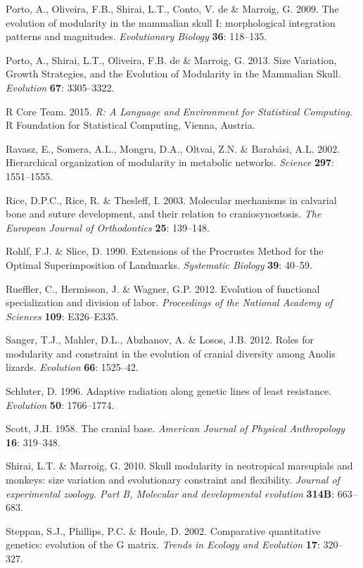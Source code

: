 \documentclass[12pt,]{article}
\begin{document}
Porto, A., Oliveira, F.B., Shirai, L.T., Conto, V. de \& Marroig, G.
2009. The evolution of modularity in the mammalian skull I:
morphological integration patterns and magnitudes. \emph{Evolutionary
Biology} \textbf{36}: 118--135.

Porto, A., Shirai, L.T., Oliveira, F.B. de \& Marroig, G. 2013. Size
Variation, Growth Strategies, and the Evolution of Modularity in the
Mammalian Skull. \emph{Evolution} \textbf{67}: 3305--3322.

R Core Team. 2015. \emph{R: A Language and Environment for Statistical
Computing}. R Foundation for Statistical Computing, Vienna, Austria.

Ravasz, E., Somera, A.L., Mongru, D.A., Oltvai, Z.N. \& Barabási, A.L.
2002. Hierarchical organization of modularity in metabolic networks.
\emph{Science} \textbf{297}: 1551--1555.

Rice, D.P.C., Rice, R. \& Thesleff, I. 2003. Molecular mechanisms in
calvarial bone and suture development, and their relation to
craniosynostosis. \emph{The European Journal of Orthodontics}
\textbf{25}: 139--148.

Rohlf, F.J. \& Slice, D. 1990. Extensions of the Procrustes Method for
the Optimal Superimposition of Landmarks. \emph{Systematic Biology}
\textbf{39}: 40--59.

Rueffler, C., Hermisson, J. \& Wagner, G.P. 2012. Evolution of
functional specialization and division of labor. \emph{Proceedings of
the National Academy of Sciences} \textbf{109}: E326--E335.

Sanger, T.J., Mahler, D.L., Abzhanov, A. \& Losos, J.B. 2012. Roles for
modularity and constraint in the evolution of cranial diversity among
Anolis lizards. \emph{Evolution} \textbf{66}: 1525--42.

Schluter, D. 1996. Adaptive radiation along genetic lines of least
resistance. \emph{Evolution} \textbf{50}: 1766--1774.

Scott, J.H. 1958. The cranial base. \emph{American Journal of Physical
Anthropology} \textbf{16}: 319--348.

Shirai, L.T. \& Marroig, G. 2010. Skull modularity in neotropical
marsupials and monkeys: size variation and evolutionary constraint and
flexibility. \emph{Journal of experimental zoology. Part B, Molecular
and developmental evolution} \textbf{314B}: 663--683.

Steppan, S.J., Phillips, P.C. \& Houle, D. 2002. Comparative
quantitative genetics: evolution of the G matrix. \emph{Trends in
Ecology and Evolution} \textbf{17}: 320--327.
\end{document}
